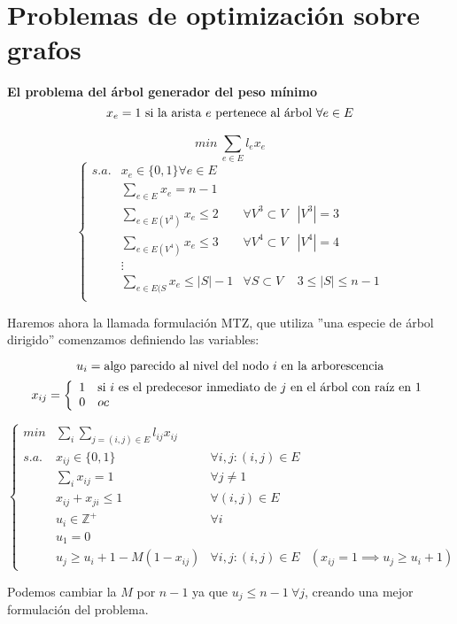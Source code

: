 \documentclass[openany]{book}
\begin{document}
\section{Problemas de optimización sobre grafos}

\begin{exercise}
    {\color{turquoise} \textbf{El problema del árbol generador del peso mínimo} }
    $$ x_{e} = 1\ \text{si la arista $ e $ pertenece al árbol $ \forall e \in E $} $$

    $$ min\ \sum\limits_{e \in E}^{} l_{e}x_{e} $$
    $$ \left\{
    \begin{array}{llcc}
        s.a. & x_{e} \in \{0,1\} \forall e \in E & \\
        & \sum\limits_{e \in E}^{}x_{e} = n-1 & \\
        & \sum\limits_{e \in E(V ^{3})}^{} x_{e} \leq 2 & \forall V ^3 \subset V & |V^3| = 3\\
        & \sum\limits_{e \in E(V ^{4})}^{} x_{e} \leq 3 & \forall V ^4 \subset V & |V^4| = 4\\
        &  \vdots\\
        & \sum\limits_{e \in E(S}^{} x_{e} \leq |S|-1 & \forall S \subset V & 3 \leq |S| \leq n-1\\

    \end{array}
    \right. $$

    Haremos ahora la llamada formulación MTZ, que utiliza ''una especie de árbol dirigido'' comenzamos definiendo las variables:


    $$ u_i = \text{algo parecido al nivel del nodo $ i $ en la arborescencia} $$
    $$ x_{ij} = \left\{
    \begin{array}{ll}
        1 & \text{si $ i $ es el predecesor inmediato de $ j $ en el árbol con raíz en 1}\\
        0 & oc
    \end{array}
    \right. $$

    $$ \left\{
    \begin{array}{llcc}
        min & \sum\limits_{i}^{}\sum\limits_{j=(i,j) \in E}^{} l_{ij}x_{ij}\\
        s.a. & x_{ij} \in \{0,1\} & \forall i,j: (i,j) \in E\\
        & \sum\limits_{i}^{}x_{ij} = 1 & \forall j \ne 1\\
        & x_{ij} + x_{ji} \leq 1 & \forall (i,j) \in E\\
        & u_i \in \mathbb{Z}^{+} & \forall i\\
        & u_1 = 0\\
        & u_j \geq u_i +1 - M (1-x_{ij}) & \forall i,j : (i,j) \in E & (x_{ij}=1 \implies u_j \geq u_i +1)

    \end{array}
    \right. $$

    Podemos cambiar la $ M $ por $ n-1 $ ya que $ u_j \leq n-1\ \forall j $, creando una mejor formulación del problema.

\end{exercise}
\end{document}
